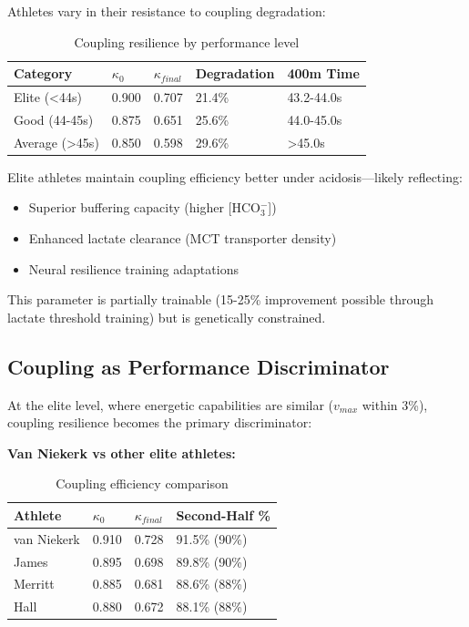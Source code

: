 Athletes vary in their resistance to coupling degradation:

\begin{table}[H]
\centering
\caption{Coupling resilience by performance level}
\begin{tabular}{@{}lllll@{}}
\toprule
\textbf{Category} & \textbf{$\kappa_0$} & \textbf{$\kappa_{final}$} & \textbf{Degradation} & \textbf{400m Time} \\
\midrule
Elite (<44s) & 0.900 & 0.707 & 21.4\% & 43.2-44.0s \\
Good (44-45s) & 0.875 & 0.651 & 25.6\% & 44.0-45.0s \\
Average (>45s) & 0.850 & 0.598 & 29.6\% & >45.0s \\
\bottomrule
\end{tabular}
\end{table}

Elite athletes maintain coupling efficiency better under acidosis—likely reflecting:
\begin{itemize}
    \item Superior buffering capacity (higher [HCO$_3^-$])
    \item Enhanced lactate clearance (MCT transporter density)
    \item Neural resilience training adaptations
\end{itemize}

This parameter is partially trainable (15-25\% improvement possible through lactate threshold training) but is genetically constrained.

\subsection{Coupling as Performance Discriminator}

At the elite level, where energetic capabilities are similar ($v_{max}$ within 3\%), coupling resilience becomes the primary discriminator:

\textbf{Van Niekerk vs other elite athletes:}

\begin{table}[H]
\centering
\caption{Coupling efficiency comparison}
\begin{tabular}{@{}llll@{}}
\toprule
\textbf{Athlete} & \textbf{$\kappa_0$} & \textbf{$\kappa_{final}$} & \textbf{Second-Half \%} \\
\midrule
van Niekerk & 0.910 & 0.728 & 91.5\% (90\%) \\
James & 0.895 & 0.698 & 89.8\% (90\%) \\
Merritt & 0.885 & 0.681 & 88.6\% (88\%) \\
Hall & 0.880 & 0.672 & 88.1\% (88\%) \\
\bottomrule
\end{tabular}
\end{table}

